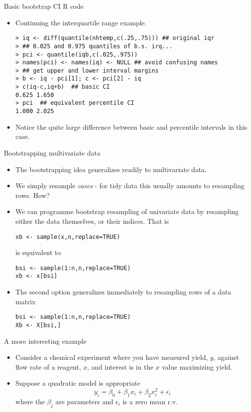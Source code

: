 \documentclass{beamer}
\newcommand{\eps}[3]
{{\begin{center}
 \rotatebox{#1}{\scalebox{#2}{\texttt{[image: \#3]}}}
 \end{center}}
}
\begin{document}
\begin{frame}[fragile]{Basic bootstrap CI R code}
\begin{itemize}
\item Continuing the interquartile range example. 
{\scriptsize \begin{verbatim}
> iq <- diff(quantile(nhtemp,c(.25,.75))) ## original iqr
> ## 0.025 and 0.975 quantiles of b.s. irq...
> pci <- quantile(iqb,c(.025,.975)) 
> names(pci) <- names(iq) <- NULL ## avoid confusing names
> ## get upper and lower interval margins
> b <- iq - pci[1]; c <- pci[2] - iq 
> c(iq-c,iq+b)  ## basic CI 
0.625 1.650 
> pci  ## equivalent percentile CI 
1.000 2.025 
\end{verbatim}}
\item Notice the quite large difference between basic and percentile intervals in this case.
\end{itemize}
\end{frame}



\begin{frame}[fragile]{Bootstrapping multivariate data}
\begin{itemize}
\item The bootstrapping idea generalizes readily to multivariate data. 
\item We simply resample {\em cases} - for tidy data this usually amounts to resampling rows. How?
\item We can programme bootstrap resampling of univariate data by resampling either the data themselves, or their indices. That is 
{\small \begin{verbatim}
xb <- sample(x,n,replace=TRUE)
\end{verbatim}
}  
is equivalent to 
{\small \begin{verbatim}
bsi <- sample(1:n,n,replace=TRUE)
xb <- x[bsi]
\end{verbatim}
}  
\item The second option generalizes immediately to resampling rows of a data matrix 
{\small \begin{verbatim}
bsi <- sample(1:n,n,replace=TRUE)
Xb <- X[bsi,]
\end{verbatim}
}  
\end{itemize}
\end{frame}

\begin{frame}{A more interesting example}
\begin{itemize}
\item Consider a chemical experiment where you have measured yield, $y$, against flow rate of a reagent, $x$, and interest is in the $x$ value maximizing yield. 
\item Suppose a quadratic model is appropriate
$$
y_i = \beta_0 + \beta_1 x_i + \beta_2 x_i^2 + \epsilon_i 
$$
where the $\beta_j$ are parameters and $\epsilon_i $ is a zero mean r.v.

\eps{-90}{.3}{quad-mod.eps}

\end{itemize}
\end{frame}
\end{document}
